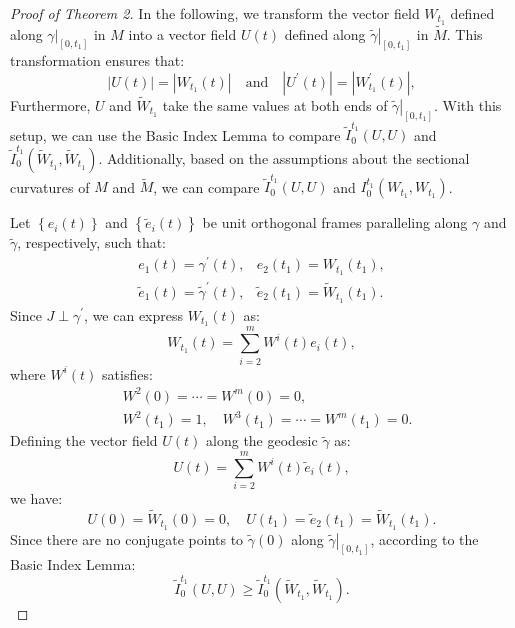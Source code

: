\documentclass{ctexart}
\begin{document}
\begin{proof}[Proof of Theorem 2]
  In the following, we transform the vector field $W_{t_1}$ defined along $\left.\gamma\right|_{\left[0, t_1\right]}$ in $M$ 
  into a vector field $U(t)$ defined along $\left.\tilde{\gamma}\right|_{\left[0, t_1\right]}$ in $\tilde{M}$. This transformation ensures that:
  $$
  |U(t)| = \left|W_{t_1}(t)\right| \quad \text{and} \quad \left|U^{\prime}(t)\right| = \left|W_{t_1}^{\prime}(t)\right|,
  $$
  Furthermore, $U$ and $\tilde{W}_{t_1}$ take the same values at both ends of $\left.\tilde{\gamma}\right|_{\left[0, t_1\right]}$. With this setup, 
  we can use the Basic Index Lemma to compare $\tilde{I}_0^{t_1}(U, U)$ and $\tilde{I}_0^{t_1}\left(\tilde{W}_{t_1}, \tilde{W}_{t_1}\right)$. 
  Additionally, based on the assumptions about the sectional curvatures of $M$ and $\tilde{M}$, we can compare $\tilde{I}_0^{t_1}(U, U)$ and $I_0^{t_1}\left(W_{t_1}, W_{t_1}\right)$.

  Let $\left\{e_i(t)\right\}$ and $\left\{\tilde{e}_i(t)\right\}$ be unit orthogonal frames paralleling along $\gamma$ and $\tilde{\gamma}$, respectively, such that:
  $$
  \begin{array}{ll}
  e_1(t)=\gamma^{\prime}(t), & e_2\left(t_1\right)=W_{t_1}\left(t_1\right), \\
  \tilde{e}_1(t)=\tilde{\gamma}^{\prime}(t), & \tilde{e}_2\left(t_1\right)=\tilde{W}_{t_1}\left(t_1\right).
  \end{array}
  $$
  Since $J \perp \gamma^{\prime}$, we can express $W_{t_1}(t)$ as:
  $$
  W_{t_1}(t)=\sum_{i=2}^m W^i(t) e_i(t),
  $$
  where $W^i(t)$ satisfies:
  $$
  \begin{aligned}
  & W^2(0)=\cdots=W^m(0)=0, \\
  & W^2\left(t_1\right)=1, \quad W^3\left(t_1\right)=\cdots=W^m\left(t_1\right)=0.
  \end{aligned}
  $$
  Defining the vector field $U(t)$ along the geodesic $\tilde{\gamma}$ as:
  $$
  U(t)=\sum_{i=2}^m W^i(t) \tilde{e}_i(t),
  $$
  we have:
  $$
  U(0)=\tilde{W}_{t_1}(0)=0, \quad U\left(t_1\right)=\tilde{e}_2\left(t_1\right)=\tilde{W}_{t_1}\left(t_1\right).
  $$
  Since there are no conjugate points to $\tilde{\gamma}(0)$ along $\left.\tilde{\gamma}\right|_{\left[0, t_1\right]}$, according to the Basic Index Lemma:
  \begin{equation}
    \tilde{I}_0^{t_1}(U, U) \geq \tilde{I}_0^{t_1}\left(\tilde{W}_{t_1}, \tilde{W}_{t_1}\right).
  \end{equation}


\end{proof}
\end{document}
